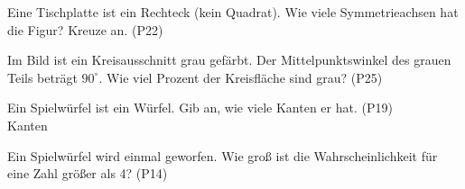 \documentclass[11pt]{article}
\begin{document}
\begin{aufgabe}{\begin{minipage}[t]{0.6\linewidth}Eine Tischplatte ist ein Rechteck (kein Quadrat). Wie viele Symmetrieachsen hat die Figur? Kreuze an. \hfill (P22) \\      \end{minipage}\hfill\begin{minipage}[t]{0.37\linewidth}\vspace{0pt}
\end{minipage}}
\end{aufgabe}

\begin{aufgabe}{\begin{minipage}[t]{0.6\linewidth}Im Bild ist ein Kreisausschnitt grau gefärbt. Der Mittelpunktswinkel des grauen Teils beträgt $90^\circ$. Wie viel Prozent der Kreisfläche sind grau? \hfill (P25) \\ \leerfeld[\%]\end{minipage}\hfill\begin{minipage}[t]{0.37\linewidth}\vspace{0pt}
\end{minipage}}
\end{aufgabe}

\begin{aufgabe}{Ein Spielwürfel ist ein Würfel. Gib an, wie viele Kanten er hat. \hfill (P19) \\ \leerfeld Kanten}
\end{aufgabe}

\begin{aufgabe}{Ein Spielwürfel wird einmal geworfen. Wie groß ist die Wahrscheinlichkeit für eine Zahl größer als 4? \hfill (P14) \\ \leerfeld}
\end{aufgabe}

\begleitteil
{}
\end{document}
